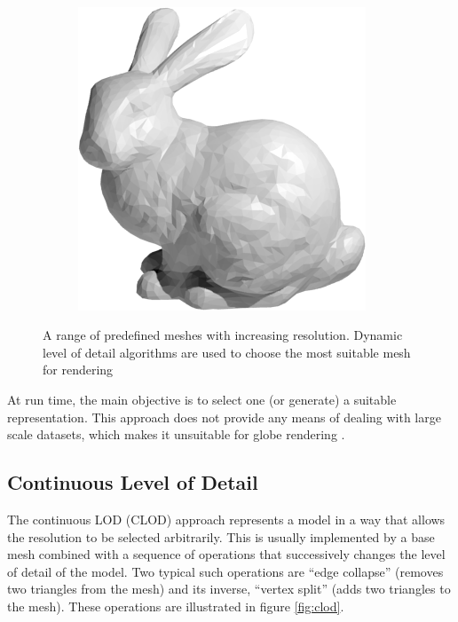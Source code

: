 \begin{figure}
\begin{subfigure}[b]{0.2\textwidth}
    \end{subfigure}
    ~ %
    \begin{subfigure}[b]{0.2\textwidth}
        \includegraphics[width=\textwidth]{figures/lod/decimation1.png}
    \end{subfigure}
    \caption{A range of predefined meshes with increasing resolution. Dynamic level of detail algorithms are used to choose the most suitable mesh for rendering}
    \label{fig:dlod}
\end{figure}

At run time, the main objective is to select one (or generate) a suitable representation. This approach does not provide any means of dealing with large scale datasets, which makes it unsuitable for globe rendering \cite{cozzi11}.


\subsection{Continuous Level of Detail}
The continuous LOD (CLOD) approach represents a model in a way that allows the resolution to be selected arbitrarily. This is usually implemented by a base mesh combined with a sequence of operations that successively changes the level of detail of the model. Two typical such operations are ``edge collapse'' (removes two triangles from the mesh) and its inverse, ``vertex split'' (adds two triangles to the mesh). These operations are illustrated in figure \ref{fig:clod}.

